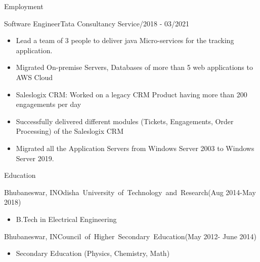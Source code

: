 \documentclass[]{mcdowellcv}
\begin{document}
\begin{cvsection}{Employment}
\begin{cvsubsection}{Software Engineer}{Tata Consultancy Service}{/2018 - 03/2021}
\begin{itemize}
                \item Lead a team of 3 people to deliver java Micro-services for the tracking application.
                \item Migrated On-premise Servers, Databases of more than 5 web applications to AWS Cloud
                \item Saleslogix CRM: Worked on a legacy CRM Product having more than 200 engagements per day
                \item Successfully delivered different modules (Tickets, Engagements, Order Processing) of the Saleslogix CRM
                \item Migrated all the Application Servers from Windows Server 2003 to Windows Server 2019.
            \end{itemize}
        \end{cvsubsection}
    \end{cvsection}

    \begin{cvsection}{Education}
        \begin{cvsubsection}{Bhubaneswar, IN}{\mbox{Odisha University of Technology and Research}}{(Aug 2014-May 2018)}
            \begin{itemize}
                \item B.Tech in Electrical Engineering
            \end{itemize}
        \end{cvsubsection}
        \begin{cvsubsection}{Bhubaneswar, IN}{\mbox{Council of Higher Secondary Education}}{(May 2012- June 2014)}
            \begin{itemize}
                \item Secondary Education (Physics, Chemistry, Math)
            \end{itemize}
        \end{cvsubsection}
    \end{cvsection}
\end{document}
